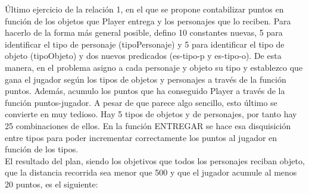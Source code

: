 Último ejercicio de la relación 1, en el que se propone contabilizar puntos en función de los objetos que Player entrega y los personajes que lo reciben. Para hacerlo de la forma más general posible, defino 10 constantes nuevas, 5 para identificar el tipo de personaje (tipoPersonaje) y 5 para identificar el tipo de objeto (tipoObjeto) y dos nuevos predicados (es-tipo-p y es-tipo-o). De esta manera, en el problema asigno a cada personaje y objeto su tipo y establezco que gana el jugador según los tipos de objetos y personajes a través de la función puntos. Además, acumulo los puntos que ha conseguido Player a través de la función puntos-jugador. A pesar de que parece algo sencillo, esto último se convierte en muy tedioso. Hay 5 tipos de objetos y de personajes, por tanto hay 25 combinaciones de ellos. En la función ENTREGAR se hace esa disquisición entre tipos para poder incrementar correctamente los puntos al jugador en función de los tipos.  \\

El resultado del plan, siendo los objetivos que todos los personajes reciban objeto, que la distancia recorrida sea menor que 500 y que el jugador acumule al menos 20 puntos, es el siguiente:


